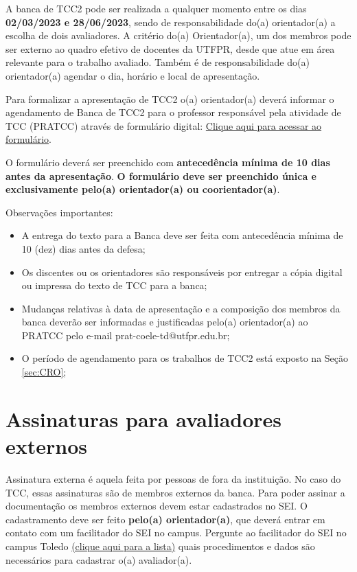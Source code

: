 \documentclass[a4paper, 12pt]{article}
\newcommand{\startdate}{02/03/2023}		%
\newcommand{\bancadate}{28/06/2023}		%
\begin{document}
    A banca de TCC2 pode ser realizada a qualquer momento entre os dias \textbf{\startdate{} e \bancadate{}}, sendo de responsabilidade do(a) orientador(a) a escolha de dois avaliadores. A critério do(a) Orientador(a), um dos membros pode ser externo ao quadro efetivo de docentes da UTFPR, desde que atue em área relevante para o trabalho avaliado. Também é de responsabilidade do(a) orientador(a) agendar o dia, horário e local de apresentação. 
    
    Para formalizar a apresentação de TCC2 o(a) orientador(a) deverá informar o agendamento de Banca de TCC2 para o professor responsável pela atividade de TCC (PRATCC) através de formulário digital: \href{https://forms.gle/QVNraTXAZ27V1xSK8}{Clique aqui para acessar ao formulário}.
    
    O formulário deverá ser preenchido com \textbf{antecedência mínima de 10 dias antes da apresentação}. \textbf{O formulário deve ser preenchido única e exclusivamente pelo(a) orientador(a) ou coorientador(a)}.    
		
    Observações importantes:
    
    \begin{itemize}
    	\item A entrega do texto para a Banca deve ser feita com antecedência mínima de 10 (dez) dias antes da defesa;
    	\item Os discentes ou os orientadores são responsáveis por entregar a cópia digital ou impressa do texto de TCC para a banca;
    	\item Mudanças relativas à data de apresentação e a composição dos membros da banca deverão ser informadas e justificadas pelo(a) orientador(a) ao PRATCC pelo e-mail prat-coele-td@utfpr.edu.br;
    	\item O período de agendamento para os trabalhos de TCC2 está exposto na Seção \ref{sec:CRO};
    \end{itemize}

	\section{Assinaturas para avaliadores externos}
	
	Assinatura externa é aquela feita por pessoas de fora da instituição. No caso do TCC, essas assinaturas são de membros externos da banca. Para poder assinar a documentação os membros externos devem estar cadastrados no SEI. O cadastramento deve ser feito \textbf{pelo(a) orientador(a)}, que deverá entrar em contato com um facilitador do SEI no campus. Pergunte ao facilitador do SEI no campus Toledo \href{http://portal.utfpr.edu.br/servidores/servicos-servidor/sei/facilitadores}{(clique aqui para a lista)} quais procedimentos e dados são necessários para cadastrar o(a) avaliador(a).
\end{document}
